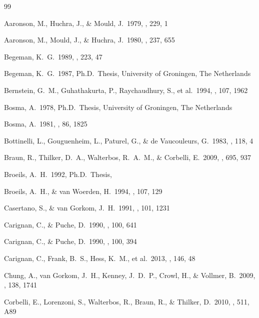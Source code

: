 \documentclass[usenatbib,useAMS]{mnras}
\begin{document}
\begin{thebibliography}{99}

 Aaronson, M., Huchra, 
J., \& Mould, J.\ 1979, \apj, 229, 1

 Aaronson, M., Mould, 
J., \& Huchra, J.\ 1980, \apj, 237, 655 

 Begeman, K.~G.\ 1989, \aap, 223, 47 

 Begeman, K.~G.\ 1987, 
Ph.D.~Thesis, University of Groningen, The Netherlands

 Bernstein, G.~M., 
Guhathakurta, P., Raychaudhury, S., et al.\ 1994, \aj, 107, 1962 

 Bosma, A.\ 1978, Ph.D.~Thesis, University of Groningen, The Netherlands

 Bosma, A.\ 1981, \aj, 86, 1825

 Bottinelli, L., Gouguenheim, L., Paturel, G., \& de Vaucouleurs, G.\ 1983, \aap, 118, 4

 Braun, R., Thilker, 
D.~A., Walterbos, R.~A.~M., \& Corbelli, E.\ 2009, \apj, 695, 937

 Broeils, A.~H.\ 1992, 
Ph.D.~Thesis,

 Broeils, A.~H., \& van Woerden, H.\ 1994, \aaps, 107, 129

 Casertano, S., \& van Gorkom, J.~H.\ 1991, \aj, 101, 1231

 Carignan, C., \& Puche, D.\ 1990, \aj, 100, 641 

 Carignan, C., \& Puche, D.\ 1990, \aj, 100, 394 

 Carignan, C., Frank, 
B.~S., Hess, K.~M., et al.\ 2013, \aj, 146, 48

 Chung, A., van Gorkom, 
J.~H., Kenney, J.~D.~P., Crowl, H., \& Vollmer, B.\ 2009, \aj, 138, 1741

 Corbelli, E., Lorenzoni, S., Walterbos, R., Braun, R., \& Thilker, D.\ 2010, \aap, 511, A89


\end{thebibliography}
\end{document}
